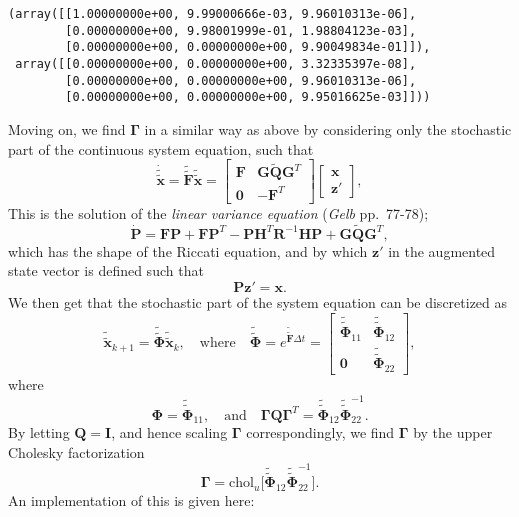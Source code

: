 \documentclass[11pt]{article}
\makeatletter
\newcommand{\boxspacing}{\kern\kvtcb@left@rule\kern\kvtcb@boxsep}
\newcommand{\prompt}[4]{
        {\ttfamily\llap{{\color{#2}[#3]:\hspace{3pt}#4}}\vspace{-\baselineskip}}
    }
\makeatother
\begin{document}
            \begin{tcolorbox}[breakable, size=fbox, boxrule=.5pt, pad at break*=1mm, opacityfill=0]
\prompt{Out}{outcolor}{4}{\boxspacing}
\begin{Verbatim}[commandchars=\\\{\}]
(array([[1.00000000e+00, 9.99000666e-03, 9.96010313e-06],
        [0.00000000e+00, 9.98001999e-01, 1.98804123e-03],
        [0.00000000e+00, 0.00000000e+00, 9.90049834e-01]]),
 array([[0.00000000e+00, 0.00000000e+00, 3.32335397e-08],
        [0.00000000e+00, 0.00000000e+00, 9.96010313e-06],
        [0.00000000e+00, 0.00000000e+00, 9.95016625e-03]]))
\end{Verbatim}
\end{tcolorbox}
        
    Moving on, we find \(\mathbf{\Gamma}\) in a similar way as above by
considering only the stochastic part of the continuous system equation,
such that \[
\dot{\tilde{\tilde{\mathbf{x}}}} = \tilde{\tilde{\mathbf{F}}} \tilde{\tilde{\mathbf{x}}} = 
\begin{bmatrix}
\mathbf{F} & \mathbf{G}\tilde{\mathbf{Q}}\mathbf{G}^T \\
\mathbf{0} & -\mathbf{F}^T
\end{bmatrix}
\begin{bmatrix}
\mathbf{x} \\
\mathbf{z}'
\end{bmatrix},
\] This is the solution of the \emph{linear variance equation}
(\emph{Gelb} pp.~77-78); \[
\dot{\mathbf{P}} = \mathbf{FP} + \mathbf{FP}^T - \mathbf{PH}^T \mathbf{R}^{-1} \mathbf{HP} + \mathbf{G}\tilde{\mathbf{Q}}\mathbf{G}^T,
\] which has the shape of the Riccati equation, and by which
\(\mathbf{z}'\) in the augmented state vector is defined such that \[
\mathbf{P}\mathbf{z}' = \mathbf{x}.
\] We then get that the stochastic part of the system equation can be
discretized as \[
\tilde{\tilde{\mathbf{x}}}_{k+1} = \tilde{\tilde{\mathbf{\Phi}}} \tilde{\tilde{\mathbf{x}}}_k, 
\quad \text{where} \quad 
\tilde{\tilde{\mathbf{\Phi}}} = e^{\tilde{\tilde{\mathbf{F}}} \Delta t} =
\begin{bmatrix}
\tilde{\tilde{\mathbf{\Phi}}}_{11} & \tilde{\tilde{\mathbf{\Phi}}}_{12} \\
\mathbf{0} & \tilde{\tilde{\mathbf{\Phi}}}_{22}
\end{bmatrix},
\] where \[
\mathbf{\Phi} = \tilde{\tilde{\mathbf{\Phi}}}_{11}, \quad \text{and} \quad \mathbf{\Gamma}\mathbf{Q}\mathbf{\Gamma}^T = \tilde{\tilde{\mathbf{\Phi}}}_{12} \tilde{\tilde{\mathbf{\Phi}}}_{22}^{-1}.
\] By letting \(\mathbf{Q} = \mathbf{I}\), and hence scaling
\(\mathbf{\Gamma}\) correspondingly, we find \(\mathbf{\Gamma}\) by the
upper Cholesky factorization \[
\mathbf{\Gamma} = \mathrm{chol}_u \bigg[ \tilde{\tilde{\mathbf{\Phi}}}_{12} \tilde{\tilde{\mathbf{\Phi}}}_{22}^{-1} \bigg].
\] An implementation of this is given here:
\end{document}
